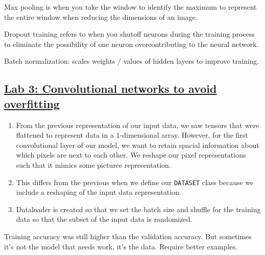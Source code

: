 \documentclass{article}
\begin{document}
Max pooling is when you take the window to identify the maximum to represent the entire window when reducing the dimensions of an image. 

Dropout training refers to when you shutoff neurons during the training process to eliminate the possibility of one neuron overcontributing to the neural network. 

Batch normalization: scales weights / values of hidden layers to improve training. 
\subsection{\href{http://dli-e5d62e622240-a8611b.westus3.cloudapp.azure.com/lab/lab/tree/03_asl_cnn.ipynb}{Lab 3: Convolutional networks to avoid overfitting}}
\begin{enumerate}
    \item From the previous representation of our input data, we saw tensors that were flattened to represent data in a $1$-dimensional array. However, for the first convolutional layer of our model, we want to retain spacial information about which pixels are next to each other. We reshape our pixel representations such that it mimics some picturee representation. 
    \item This differs from the previous when we define our \verb|DATASET| class because we include a reshaping of the input data representation.
    \item Dataloader is created so that we set the batch size and shuffle for the training data so that the subset of the input data is randomized.
\end{enumerate}
Training accuracy was still higher than the validation accuracy. But sometimes it's not the model that needs work, it's the data. Require better examples. 
\end{document}
